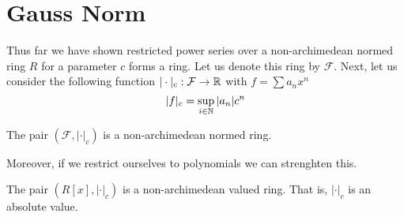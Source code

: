 \chapter{Gauss Norm}

Thus far we have shown restricted power series over a non-archimedean normed ring $R$ for a
parameter $c$ forms a ring. Let us denote this ring by $\mathcal{F}$. Next, let us consider the
following function $| \cdot |_c :  \mathcal{F} \to \mathbb{R}$ with $f = \sum a_n x^n$
\[
    |f|_c = \sup_{i \in \mathbb{N}} |a_n|c^n
\]

\begin{lemma}
  The pair $(\mathcal{F}, | \cdot |_c)$ is a non-archimedean normed ring.
\end{lemma}

Moreover, if we restrict ourselves to polynomials we can strenghten this.

\begin{lemma}
  The pair $(R[x], | \cdot |_c)$ is a non-archimedean valued ring. That is, $| \cdot |_c$ is an
  absolute value.
\end{lemma}
